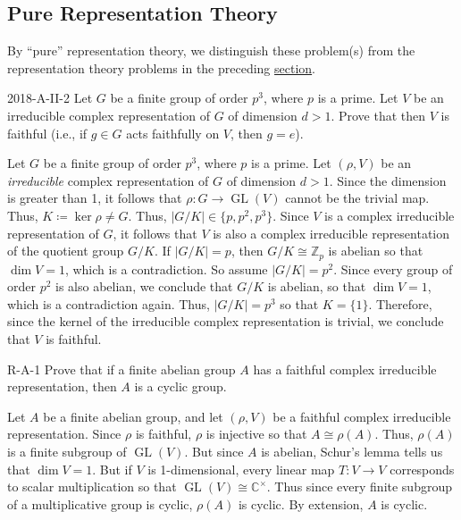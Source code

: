 \documentclass{article}
\begin{document}
	\subsection{Pure Representation Theory}
	By ``pure'' representation theory, we distinguish these problem(s) from the representation theory problems in the preceding \hyperref[subsec:modules]{section}.
	\begin{prb}{2018-A-II-2}
		Let $G$ be a finite group of order $p^{3}$, where $p$ is a prime. Let $V$ be an irreducible complex representation of $G$ of dimension $d > 1$. Prove that then $V$ is faithful (i.e., if $g \in G$ acts faithfully on $V$, then $g = e$). 
	\end{prb}
	Let $G$ be a finite group of order $p^{3}$, where $p$ is a prime. Let $(\rho, V)$ be an \textit{irreducible} complex representation of $G$ of dimension $d > 1$. Since the dimension is greater than 1, it follows that $\rho: G \to \operatorname{GL}(V)$ cannot be the trivial map. Thus, $K \coloneqq \ker{\rho} \neq G$. Thus, $|G/K| \in \{p, p^2, p^{3}\}$. Since $V$ is a complex irreducible representation of $G$, it follows that $V$ is also a complex irreducible representation of the quotient group $G/K$. If $|G/K| = p$, then $G/K \cong \mathbb{Z}_{p}$ is abelian so that $\dim{V} = 1$, which is a contradiction. So assume $|G/K| = p^{2}$. Since every group of order $p^{2}$ is also abelian, we conclude that $G/K$ is abelian, so that $\dim{V} = 1$, which is a contradiction again. Thus, $|G/K| = p^{3}$ so that $K = \{1\}$. Therefore, since the kernel of the irreducible complex representation is trivial, we conclude that $V$ is faithful. 
	
	\begin{prb}{R-A-1}
		Prove that if a finite abelian group $A$ has a faithful complex irreducible representation, then $A$ is a cyclic group. 
	\end{prb}
	Let $A$ be a finite abelian group, and let $(\rho, V)$ be a faithful complex irreducible representation. Since $\rho$ is faithful, $\rho$ is injective so that $A \cong \rho(A)$. Thus, $\rho(A)$ is a finite subgroup of $\operatorname{GL}(V)$. But since $A$ is abelian, Schur's lemma tells us that $\dim{V} = 1$. But if $V$ is 1-dimensional, every linear map $T: V \to V$ corresponds to scalar multiplication so that $\operatorname{GL}(V) \cong \mathbb{C}^{\times}$. Thus since every finite subgroup of a multiplicative group is cyclic, $\rho(A)$ is cyclic. By extension, $A$ is cyclic. 
	
\end{document}
